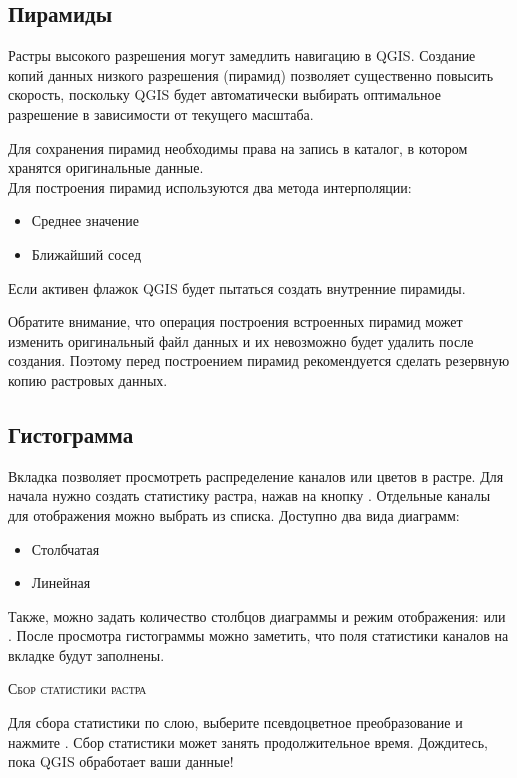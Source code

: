 \subsection{Пирамиды}\label{raster_pyramids}

Растры высокого разрешения могут замедлить навигацию в QGIS. Создание
копий данных низкого разрешения (пирамид) позволяет существенно повысить
скорость, поскольку QGIS будет автоматически выбирать оптимальное
разрешение в зависимости от текущего масштаба.

Для сохранения пирамид необходимы права на запись в каталог, в котором
хранятся оригинальные данные. \\
Для построения пирамид используются два метода интерполяции:
\begin{itemize}[label=--]
\item Среднее значение
\item Ближайший сосед
\end{itemize}

Если активен флажок
 QGIS будет
пытаться создать внутренние пирамиды.

Обратите внимание, что операция построения встроенных пирамид может
изменить оригинальный файл данных и их невозможно будет удалить после
создания. Поэтому перед построением пирамид рекомендуется сделать резервную копию
растровых данных.

\subsection{Гистограмма}\label{label_histogram}

Вкладка  позволяет просмотреть распределение 
каналов или цветов в растре. Для начала нужно создать статистику растра,
нажав на кнопку . Отдельные каналы для
отображения можно выбрать из списка. Доступно два вида диаграмм:

\begin{itemize}[label=--]
\item Столбчатая
\item Линейная
\end{itemize}

Также, можно задать количество столбцов диаграммы и режим отображения:
 или .
После просмотра гистограммы можно заметить, что поля статистики каналов
на вкладке  будут заполнены.

\begin{Tip}\caption{\textsc{Сбор статистики растра}}
Для сбора статистики по слою, выберите псевдоцветное преобразование и
нажмите . Сбор статистики может занять продолжительное
время. Дождитесь, пока QGIS обработает ваши данные!
\end{Tip}

\FloatBarrier
